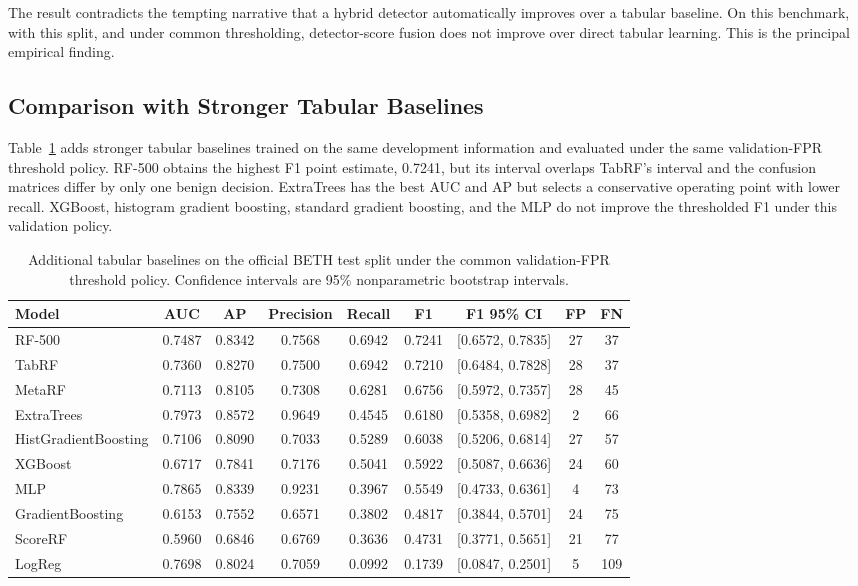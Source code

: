\documentclass[journal]{IEEEtran}
\begin{document}
The result contradicts the tempting narrative that a hybrid detector automatically improves over a tabular baseline. On this benchmark, with this split, and under common thresholding, detector-score fusion does not improve over direct tabular learning. This is the principal empirical finding.

\subsection{Comparison with Stronger Tabular Baselines}

Table~\ref{tab:sota_tabular} adds stronger tabular baselines trained on the same development information and evaluated under the same validation-FPR threshold policy. RF-500 obtains the highest F1 point estimate, 0.7241, but its interval overlaps TabRF's interval and the confusion matrices differ by only one benign decision. ExtraTrees has the best AUC and AP but selects a conservative operating point with lower recall. XGBoost, histogram gradient boosting, standard gradient boosting, and the MLP do not improve the thresholded F1 under this validation policy.

\begin{table}[t]
\centering
\caption{Additional tabular baselines on the official BETH test split under the common validation-FPR threshold policy. Confidence intervals are 95\% nonparametric bootstrap intervals.}
\label{tab:sota_tabular}
\begin{tabular}{lcccccccc}
\toprule
\textbf{Model} & \textbf{AUC} & \textbf{AP} & \textbf{Precision} & \textbf{Recall} & \textbf{F1} & \textbf{F1 95\% CI} & \textbf{FP} & \textbf{FN} \\
\midrule
RF-500 & 0.7487 & 0.8342 & 0.7568 & 0.6942 & 0.7241 & [0.6572, 0.7835] & 27 & 37 \\
TabRF & 0.7360 & 0.8270 & 0.7500 & 0.6942 & 0.7210 & [0.6484, 0.7828] & 28 & 37 \\
MetaRF & 0.7113 & 0.8105 & 0.7308 & 0.6281 & 0.6756 & [0.5972, 0.7357] & 28 & 45 \\
ExtraTrees & 0.7973 & 0.8572 & 0.9649 & 0.4545 & 0.6180 & [0.5358, 0.6982] & 2 & 66 \\
HistGradientBoosting & 0.7106 & 0.8090 & 0.7033 & 0.5289 & 0.6038 & [0.5206, 0.6814] & 27 & 57 \\
XGBoost & 0.6717 & 0.7841 & 0.7176 & 0.5041 & 0.5922 & [0.5087, 0.6636] & 24 & 60 \\
MLP & 0.7865 & 0.8339 & 0.9231 & 0.3967 & 0.5549 & [0.4733, 0.6361] & 4 & 73 \\
GradientBoosting & 0.6153 & 0.7552 & 0.6571 & 0.3802 & 0.4817 & [0.3844, 0.5701] & 24 & 75 \\
ScoreRF & 0.5960 & 0.6846 & 0.6769 & 0.3636 & 0.4731 & [0.3771, 0.5651] & 21 & 77 \\
LogReg & 0.7698 & 0.8024 & 0.7059 & 0.0992 & 0.1739 & [0.0847, 0.2501] & 5 & 109 \\
\bottomrule
\end{tabular}
\end{table}
\end{document}

